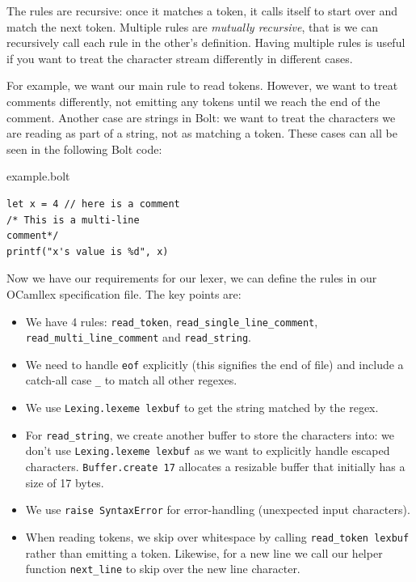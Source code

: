 The rules are recursive: once it matches a token, it calls itself to
start over and match the next token. Multiple rules are \emph{mutually
recursive}, that is we can recursively call each rule in the other's
definition. Having multiple rules is useful if you want to treat the
character stream differently in different cases.

For example, we want our main rule to read tokens. However, we want to
treat comments differently, not emitting any tokens until we reach the
end of the comment. Another case are strings in Bolt: we want to treat
the characters we are reading as part of a string, not as matching a
token. These cases can all be seen in the following Bolt code:

{example.bolt}

\begin{verbatim}
let x = 4 // here is a comment
/* This is a multi-line   
comment*/
printf("x's value is %d", x)
\end{verbatim}

Now we have our requirements for our lexer, we can define the rules in
our OCamllex specification file. The key points are:

\begin{itemize}
\tightlist
\item
  We have 4 rules: \texttt{read\_token},
  \texttt{read\_single\_line\_comment},
  \texttt{read\_multi\_line\_comment} and \texttt{read\_string}.
\item
  We need to handle \texttt{eof} explicitly (this signifies the end of
  file) and include a catch-all case \texttt{\_} to match all other
  regexes.
\item
  We use \texttt{Lexing.lexeme\ lexbuf} to get the string matched by the
  regex.
\item
  For \texttt{read\_string}, we create another buffer to store the
  characters into: we don't use \texttt{Lexing.lexeme\ lexbuf} as we
  want to explicitly handle escaped characters.
  \texttt{Buffer.create\ 17} allocates a resizable buffer that initially
  has a size of 17 bytes.
\item
  We use \texttt{raise\ SyntaxError} for error-handling (unexpected
  input characters).
\item
  When reading tokens, we skip over whitespace by calling
  \texttt{read\_token\ lexbuf} rather than emitting a token. Likewise,
  for a new line we call our helper function \texttt{next\_line} to skip
  over the new line character.
\end{itemize}

